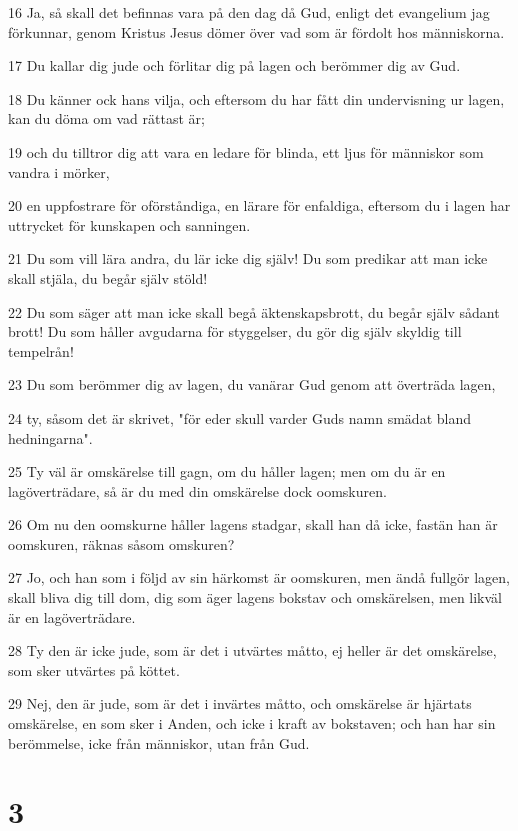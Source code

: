 \par 16 Ja, så skall det befinnas vara på den dag då Gud, enligt det evangelium jag förkunnar, genom Kristus Jesus dömer över vad som är fördolt hos människorna.
\par 17 Du kallar dig jude och förlitar dig på lagen och berömmer dig av Gud.
\par 18 Du känner ock hans vilja, och eftersom du har fått din undervisning ur lagen, kan du döma om vad rättast är;
\par 19 och du tilltror dig att vara en ledare för blinda, ett ljus för människor som vandra i mörker,
\par 20 en uppfostrare för oförståndiga, en lärare för enfaldiga, eftersom du i lagen har uttrycket för kunskapen och sanningen.
\par 21 Du som vill lära andra, du lär icke dig själv! Du som predikar att man icke skall stjäla, du begår själv stöld!
\par 22 Du som säger att man icke skall begå äktenskapsbrott, du begår själv sådant brott! Du som håller avgudarna för styggelser, du gör dig själv skyldig till tempelrån!
\par 23 Du som berömmer dig av lagen, du vanärar Gud genom att överträda lagen,
\par 24 ty, såsom det är skrivet, "för eder skull varder Guds namn smädat bland hedningarna".
\par 25 Ty väl är omskärelse till gagn, om du håller lagen; men om du är en lagöverträdare, så är du med din omskärelse dock oomskuren.
\par 26 Om nu den oomskurne håller lagens stadgar, skall han då icke, fastän han är oomskuren, räknas såsom omskuren?
\par 27 Jo, och han som i följd av sin härkomst är oomskuren, men ändå fullgör lagen, skall bliva dig till dom, dig som äger lagens bokstav och omskärelsen, men likväl är en lagöverträdare.
\par 28 Ty den är icke jude, som är det i utvärtes måtto, ej heller är det omskärelse, som sker utvärtes på köttet.
\par 29 Nej, den är jude, som är det i invärtes måtto, och omskärelse är hjärtats omskärelse, en som sker i Anden, och icke i kraft av bokstaven; och han har sin berömmelse, icke från människor, utan från Gud.

\chapter{3}

